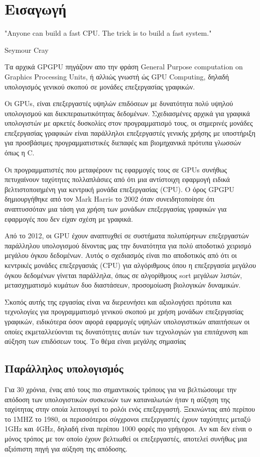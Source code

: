 \chapter{Εισαγωγή}
\epigraph{"Anyone can build a fast CPU. The trick is to build a fast system."}{Seymour Cray}

Τα αρχικά GPGPU πηγάζουν απο την φράση General Purpose computation on Graphics Processing Units, ή αλλιώς γνωστή ώς GPU Computing, δηλαδή υπολογισμός γενικού σκοπού σε μονάδες επεξεργασίας γραφικών.

Οι GPUs, είναι επεξεργαστές υψηλών επιδόσεων με δυνατότητα πολύ υψηλού υπολογισμού και διεκπεραιωτικότητας δεδομένων. Σχεδιασμένες αρχικά για γραφικά υπολογιστών με αρκετές δυσκολίες στον προγραμματισμό τους, οι σημερινές μονάδες επεξεργασίας γραφικών είναι παράλληλοι επεξεργαστές γενικής χρήσης με υποστήριξη για προσβάσιμες προγραμματιστικές διεπαφές και βιομηχανικά πρότυπα γλωσσών όπως η C.

Οι προγραμματιστές που μεταφέρουν τις εφαρμογές τους σε GPUs συνήθως πετυχαίνουν ταχύτητες πολλαπλάσιες από ότι μια αντίστοιχη εφαρμογή ειδικά βελτιστοποιημένη για κεντρική μονάδα επεξεργασίας (CPU).
Ο όρος GPGPU δημιουργήθηκε από τον Mark Harris το 2002 όταν συνειδητοποίησε ότι αναπτυσσόταν μια τάση για χρήση των μονάδων επεξεργασίας γραφικών για εφαρμογές που δεν είχαν σχέση με γραφικά. 

Από το 2012, οι GPU έχουν αναπτυχθεί σε συστήματα πολυπύρηνων επεξεργαστών παράλληλου υπολογισμού δίνοντας μας την δυνατότητα για πολύ αποδοτικό χειρισμό μεγάλου όγκου δεδομένων. Αυτός ο σχεδιασμός είναι πιο αποδοτικός από ότι οι κεντρικές μονάδες επεξεργασιάς (CPU) για αλγόριθμους όπου η επεξεργασία μεγάλου όγκου δεδομένων γίνεται παράλληλα, όπως σε αλγορίθμους sort μεγάλων λιστών, μετασχηματισμό κυμάτων δυο διαστάσεων, προσομοίωση βιολογικών δυναμικών.

Σκοπός αυτής της εργασίας είναι να διερευνήσει και αξιολογήσει πρότυπα και τεχνολογίες για προγραμματισμό γενικού σκοπού με χρήση μονάδων επεξεργασίας γραφικών, ειδικότερα όσον αφορά εφαρμογές υψηλών υπολογιστικών απαιτήσεων οι οποίες εκμεταλλεύονται τις δυνατότητες αυτών των τεχνολογιών για επιτάχυνση και αύξηση των επιδόσεων τους. Το θέμα είναι μεγάλης σημασίας



\section{Παράλληλος υπολογισμός}
Για 30 χρόνια, ένας από τους πιο σημαντικούς τρόπους για να βελτιώσουμε την απόδοση των υπολογιστικών συσκευών των καταναλωτών ήταν η αύξηση της ταχύτητας στην οποία λειτουργεί το ρολόι ενός επεξεργαστή. Ξεκινώντας από περίπου το 1MHZ το 1980, οι περισσότεροι σύγχρονοι επεξεργαστές έχουν ταχύτητες μεταξύ 1GHz και 4GHz, δηλαδή είναι περίπου 1000 φορές πιο γρήγοροι. Αν και δεν είναι ο μόνος τρόπος με τον οποίο έχουν βελτιωθεί οι επεξεργαστές, αποτελεί συνήθως μια αξιόπιστη πηγή για αύξηση της απόδοσης.

